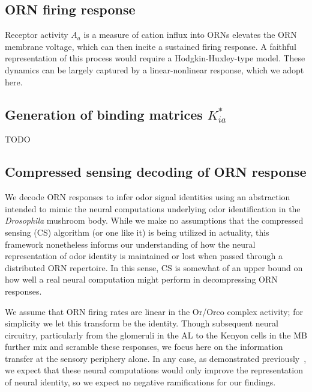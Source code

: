 \documentclass[9pt,twocolumn,twoside,lineno]{pnas-new}
\begin{document}
\subsection*{ORN firing response}

Receptor activity $A_a$ is a measure of cation influx into ORNs elevates the ORN membrane voltage, which can then incite a sustained firing response. A faithful representation of this process would require a Hodgkin-Huxley-type model. These dynamics can be largely captured by a linear-nonlinear response, which we adopt here. 

\subsection*{Generation of binding matrices $K^*_{ia}$}
 TODO

\subsection*{Compressed sensing decoding of ORN response}
We decode ORN responses to infer odor signal identities using an abstraction intended to mimic the neural computations underlying odor identification in the \textit{Drosophila} mushroom body. While we make no assumptions that the compressed sensing (CS) algorithm (or one like it) is being utilized in actuality, this framework nonetheless informs our understanding of how the neural representation of odor identity is maintained or lost when passed through a distributed ORN repertoire. In this sense, CS is somewhat of an upper bound on how well a real neural computation might perform in decompressing ORN responses.

We assume that ORN firing rates are linear in the Or/Orco complex activity; for simplicity we let this transform be the identity. Though subsequent neural circuitry, particularly from the glomeruli in the AL to the Kenyon cells in the MB further mix and scramble these responses, we focus here on the information transfer at the sensory periphery alone. In any case, as demonstrated previously~\cite{vijay_1}, we expect that these neural computations would only improve the representation of neural identity, so we expect no negative ramifications for our findings.
\end{document}
